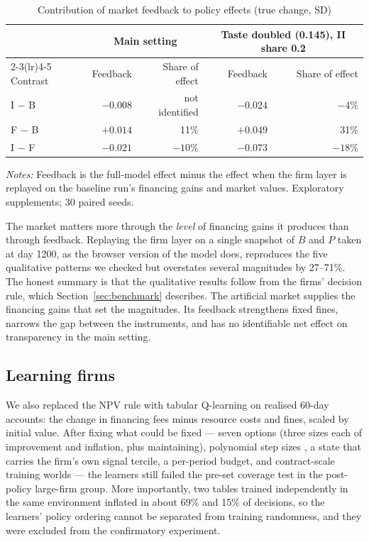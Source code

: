 \documentclass[11pt]{article}
\begin{document}
\begin{table}[t]
\centering
\small
\begin{threeparttable}
\caption{Contribution of market feedback to policy effects (true change, SD)}
\label{tab:feedback}
\begin{tabular}{@{}lrrrr@{}}
\toprule
 & \multicolumn{2}{c}{Main setting} & \multicolumn{2}{c}{Taste doubled (0.145), II share 0.2} \\
\cmidrule(lr){2-3}\cmidrule(lr){4-5}
Contrast & Feedback & Share of effect & Feedback & Share of effect \\
\midrule
I $-$ B & $-0.008$ & not identified & $-0.024$ & $-4\%$ \\
F $-$ B & $+0.014$ & 11\% & $+0.049$ & 31\% \\
I $-$ F & $-0.021$ & $-10\%$ & $-0.073$ & $-18\%$ \\
\bottomrule
\end{tabular}
\begin{tablenotes}[flushleft]\footnotesize
\item \textit{Notes:} Feedback is the full-model effect minus the effect when the firm layer is replayed on the baseline run's financing gains and market values. Exploratory supplements; 30 paired seeds.
\end{tablenotes}
\end{threeparttable}
\end{table}

The market matters more through the \emph{level} of financing gains it produces than through feedback. Replaying the firm layer on a single snapshot of $B$ and $P$ taken at day 1200, as the browser version of the model does, reproduces the five qualitative patterns we checked but overstates several magnitudes by 27--71\%. The honest summary is that the qualitative results follow from the firms' decision rule, which Section~\ref{sec:benchmark} describes. The artificial market supplies the financing gains that set the magnitudes. Its feedback strengthens fixed fines, narrows the gap between the instruments, and has no identifiable net effect on transparency in the main setting.

\subsection{Learning firms}\label{sec:learning}

We also replaced the NPV rule with tabular Q-learning on realised 60-day accounts: the change in financing fees minus resource costs and fines, scaled by initial value. After fixing what could be fixed --- seven options (three sizes each of improvement and inflation, plus maintaining), polynomial step sizes \citep{evendar2003learning}, a state that carries the firm's own signal tercile, a per-period budget, and contract-scale training worlds --- the learners still failed the pre-set coverage test in the post-policy large-firm group. More importantly, two tables trained independently in the same environment inflated in about 69\% and 15\% of decisions, so the learners' policy ordering cannot be separated from training randomness, and they were excluded from the confirmatory experiment.
\end{document}
